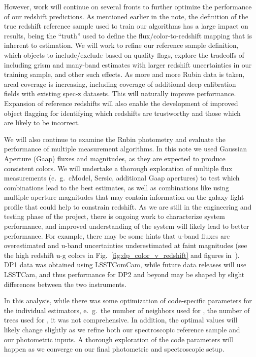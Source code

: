 However, work will continue on several fronts to further optimize the performance of our redshift predictions.  As mentioned earlier in the note, the definition of the true redshift reference sample used to train our algorithms has a large impact on results, being the ``truth'' used to define the flux/color-to-redshift mapping that is inherent to \photoz estimation.  We will work to refine our reference sample definition, which objects to include/exclude based on quality flags, explore the tradeoffs of including grism and many-band \photoz estimates with larger redshift uncertainties in our training sample, and other such effects.  As more and more Rubin data is taken, areal coverage is increasing, including coverage of additional deep calibration fields with existing spec-z datasets.  This will naturally improve \photoz performance.  Expansion of reference redshifts will also enable the development of improved object flagging for identifying which redshifts are trustworthy and those which are likely to be incorrect.

We will also continue to examine the Rubin photometry and evaluate the performance of multiple measurement algorithms.  In this note we used Gaussian Aperture (Gaap) fluxes and magnitudes, as they are expected to produce consistent colors.  We will undertake a thorough exploration of multiple flux measurements (e.~g.~cModel, Sersic, additional Gaap apertures) to test which combinations lead to the best \photoz estimates, as well as combinations like using multiple aperture magnitudes that may contain information on the galaxy light profile that could help to constrain redshift.  As we are still in the engineering and testing phase of the project, there is ongoing work to characterize system performance, and improved understanding of the system will likely lead to better \photoz performance.  For example, there may be some hints that u-band fluxes are overestimated and u-band uncertainties underestimated at faint magnitudes (see the high redshift u-g colors in Fig.~\ref{fig:dp_color_v_redshift} and figures in~\citet{RTN-095}).  DP1 data was obtained using LSSTComCam, while future data releases will use LSSTCam, and thus performance for DP2 and beyond may be shaped by slight differences between the two instruments.  

In this analysis, while there was some optimization of code-specific parameters for the individual estimators, e.~g.~the number of neighbors used for , the number of trees used for , it was not comprehensive.  In addition, the optimal values will likely change slightly as we refine both our spectroscopic reference sample and our photometric inputs.  A thorough exploration of the code parameters will happen as we converge on our final photometric and spectroscopic setup.

